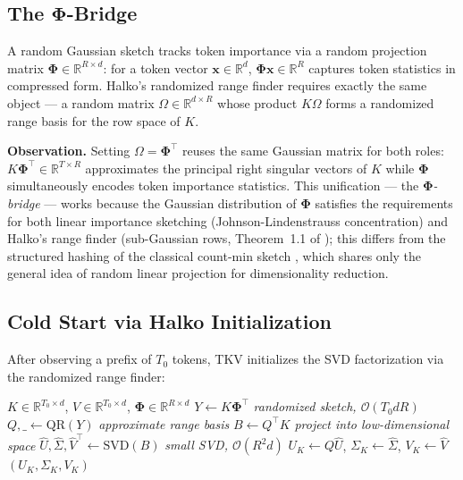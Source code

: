 \documentclass{article}
\newcommand{\R}{\mathbb{R}}
\let\PhiSymbol\Phi
\renewcommand{\Phi}{\boldsymbol{\PhiSymbol}}
\begin{document}
\subsection{The \texorpdfstring{$\Phi$}{Phi}-Bridge}
\label{sec:phi}

A random Gaussian sketch tracks token importance via a random projection
matrix $\Phi \in \R^{R \times d}$: for a token vector $\mathbf{x} \in \R^d$,
$\Phi \mathbf{x} \in \R^R$ captures token statistics in compressed form.
Halko's randomized range finder requires exactly the same object --- a
random matrix $\Omega \in \R^{d \times R}$ whose product $K\Omega$ forms a
randomized range basis for the row space of $K$.

\textbf{Observation.}  Setting $\Omega = \Phi^\top$ reuses the same
Gaussian matrix for both roles: $K\Phi^\top \in \R^{T \times R}$
approximates the principal right singular vectors of $K$ while $\Phi$
simultaneously encodes token importance statistics.  This unification ---
the \emph{$\Phi$-bridge} --- works because the Gaussian distribution of
$\Phi$ satisfies the requirements for both linear importance sketching
(Johnson-Lindenstrauss concentration) and Halko's range finder
(sub-Gaussian rows, Theorem~1.1 of \citep{halko2011}); this differs from
the structured hashing of the classical count-min sketch
\citep{cormode2005}, which shares only the general idea of random linear
projection for dimensionality reduction.

\subsection{Cold Start via Halko Initialization}
\label{sec:coldstart}

After observing a prefix of $T_0$ tokens, TKV initializes the SVD factorization
via the randomized range finder:

\begin{algorithm}[H]
\caption{Halko Cold Start with $\Phi$-Bridge}
\begin{algorithmic}[1]
\Require $K \in \R^{T_0 \times d}$, $V \in \R^{T_0 \times d}$, $\Phi \in \R^{R \times d}$
\State $Y \leftarrow K \Phi^\top$  \hfill \textit{randomized sketch, $\mathcal{O}(T_0 d R)$}
\State $Q, \_ \leftarrow \mathrm{QR}(Y)$  \hfill \textit{approximate range basis}
\State $B \leftarrow Q^\top K$  \hfill \textit{project into low-dimensional space}
\State $\hat{U}, \hat{\Sigma}, \hat{V}^\top \leftarrow \mathrm{SVD}(B)$  \hfill \textit{small SVD, $\mathcal{O}(R^2 d)$}
\State $U_K \leftarrow Q \hat{U}$, $\Sigma_K \leftarrow \hat{\Sigma}$, $V_K \leftarrow \hat{V}$
\State \Return $(U_K, \Sigma_K, V_K)$
\end{algorithmic}
\end{algorithm}
\end{document}
